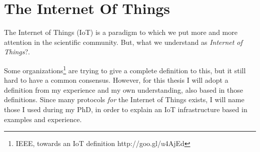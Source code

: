 \chapter{The Internet Of Things}
\label{sec:background}

The Internet of Things (IoT) is a paradigm to which we put more and more attention in the scientific community.
But, what we understand as \textit{Internet of Things}?.

Some organizations\footnote{IEEE, towards an IoT definition http://goo.gl/u4AjEd} are trying to give a complete definition to this, but it still hard to have a common consensus.
However, for this thesis I will adopt a definition from my experience and my own understanding, also based in those definitions.
Since many protocols \textit{for} the Internet of Things exists, I will name those I used during my PhD, in order to explain an IoT infrastructure based in examples and experience.

